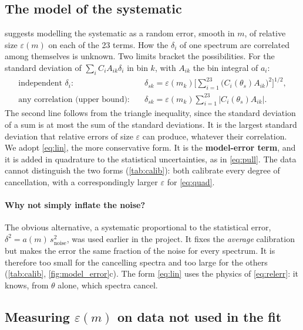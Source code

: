 \documentclass[11pt]{article}
\newcommand{\snoise}{s_{\text{noise}}}
\begin{document}
\subsection{The model of the systematic}
\label{sec:model_error}

 suggests modelling the systematic as a random error, smooth in $m$, of
relative size $\varepsilon(m)$ on each of the 23 terms. How the $\delta_i$ of one spectrum are
correlated among themselves is unknown. Two limits bracket the possibilities. For the
standard deviation of $\sum_iC_iA_{ik}\delta_i$ in bin $k$, with $A_{ik}$ the bin integral of
$a_i$:
\begin{align}
  \text{independent } \delta_i:\quad & \delta_{sk} = \varepsilon(m_k)\Big[\sum_{i=1}^{23}
    \big(C_i(\theta_s)A_{ik}\big)^2\Big]^{1/2}, \label{eq:quad}\\
  \text{any correlation (upper bound):}\quad & \delta_{sk} = \varepsilon(m_k)\sum_{i=1}^{23}
    \big|C_i(\theta_s)A_{ik}\big| . \label{eq:lin}
\end{align}
The second line follows from the triangle inequality, since the standard deviation of a sum is
at most the sum of the standard deviations. It is the largest standard deviation that relative
errors of size $\varepsilon$ can produce, whatever their correlation. We adopt
\cref{eq:lin}, the more conservative form. It is the \textbf{model-error term}, and it is
added in quadrature to the statistical uncertainties, as in \cref{eq:pull}. The data cannot
distinguish the two forms (\cref{tab:calib}): both calibrate every degree of cancellation,
with a correspondingly larger $\varepsilon$ for \cref{eq:quad}.

\paragraph{Why not simply inflate the noise?} The obvious alternative, a systematic
proportional to the statistical error, $\delta^2 = a(m)\,\snoise^2$, was used earlier in the
project. It fixes the \emph{average} calibration but makes the error the same fraction of the
noise for every spectrum. It is therefore too small for the cancelling spectra and too large
for the others (\cref{tab:calib}, \cref{fig:model_error}c). The form \cref{eq:lin} uses the
physics of \cref{eq:relerr}: it knows, from $\theta$ alone, which spectra cancel.

\subsection{Measuring $\varepsilon(m)$ on data not used in the fit}
\label{sec:eps}
\end{document}
